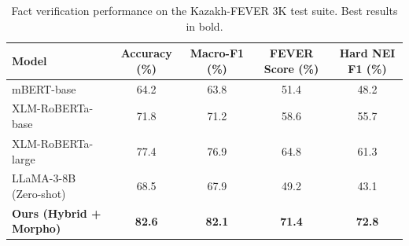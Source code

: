 \begin{table}[ht]
\centering
\small
\caption{Fact verification performance on the Kazakh-FEVER 3K test suite. Best results in bold.}
\label{tab:main_results}
\begin{tabular}{lcccc}
\toprule
\textbf{Model} & \textbf{Accuracy (\%)} & \textbf{Macro-F1 (\%)} & \textbf{FEVER Score (\%)} & \textbf{Hard NEI F1 (\%)} \\
\midrule
mBERT-base & 64.2 & 63.8 & 51.4 & 48.2 \\
XLM-RoBERTa-base & 71.8 & 71.2 & 58.6 & 55.7 \\
XLM-RoBERTa-large & 77.4 & 76.9 & 64.8 & 61.3 \\
LLaMA-3-8B (Zero-shot) & 68.5 & 67.9 & 49.2 & 43.1 \\
\midrule
\textbf{Ours (Hybrid + Morpho)} & \textbf{82.6} & \textbf{82.1} & \textbf{71.4} & \textbf{72.8} \\
\bottomrule
\end{tabular}
\end{table}
